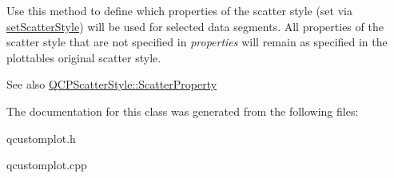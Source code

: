 Use this method to define which properties of the scatter style (set via \hyperlink{classQCPSelectionDecorator_ab403a613289714ff4fd4a0c0371ab116}{set\+Scatter\+Style}) will be used for selected data segments. All properties of the scatter style that are not specified in {\itshape properties} will remain as specified in the plottable\textquotesingle{}s original scatter style.

\begin{DoxySeeAlso}{See also}
\hyperlink{classQCPScatterStyle_a8974f6a20f8f6eea7781f0e6af9deb46}{Q\+C\+P\+Scatter\+Style\+::\+Scatter\+Property} 
\end{DoxySeeAlso}


The documentation for this class was generated from the following files\+:\begin{DoxyCompactItemize}
\item 
qcustomplot.\+h\item 
qcustomplot.\+cpp\end{DoxyCompactItemize}
